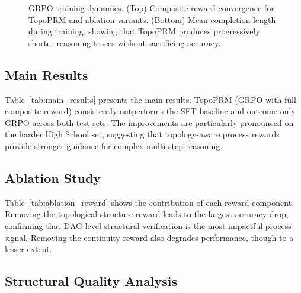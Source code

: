 \begin{figure}[t]
    \centering
    \caption{GRPO training dynamics. (Top) Composite reward convergence
    for TopoPRM and ablation variants. (Bottom) Mean completion length
    during training, showing that TopoPRM produces progressively shorter
    reasoning traces without sacrificing accuracy.}
    \label{fig:training_dynamics}
\end{figure}

\subsection{Main Results}
\label{sec:main_results}



Table~\ref{tab:main_results} presents the main results. TopoPRM
(GRPO with full composite reward) consistently outperforms the SFT
baseline and outcome-only GRPO across both test sets. The improvements
are particularly pronounced on the harder High School set, suggesting
that topology-aware process rewards provide stronger guidance for complex
multi-step reasoning.

\subsection{Ablation Study}
\label{sec:ablation}



Table~\ref{tab:ablation_reward} shows the contribution of each reward
component. Removing the topological structure reward leads to the largest
accuracy drop, confirming that DAG-level structural verification is the
most impactful process signal. Removing the continuity reward also
degrades performance, though to a lesser extent.

\subsection{Structural Quality Analysis}
\label{sec:structural_quality}

